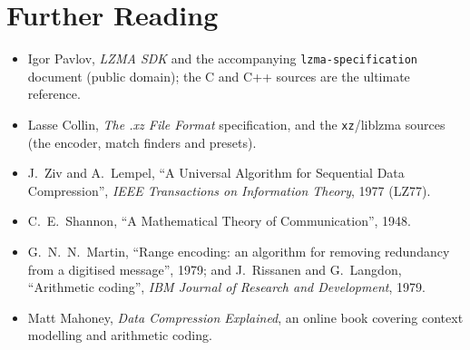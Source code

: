 \documentclass[11pt,a4paper,oneside]{book}
\begin{document}
\chapter{Further Reading}

\begin{itemize}
\item Igor Pavlov, \emph{LZMA SDK} and the accompanying \texttt{lzma-specification} document (public domain); the C and C++ sources are the ultimate reference.
\item Lasse Collin, \emph{The .xz File Format} specification, and the \texttt{xz}/liblzma sources (the encoder, match finders and presets).
\item J.\ Ziv and A.\ Lempel, ``A Universal Algorithm for Sequential Data Compression'', \emph{IEEE Transactions on Information Theory}, 1977 (LZ77).
\item C.\ E.\ Shannon, ``A Mathematical Theory of Communication'', 1948.
\item G.\ N.\ N.\ Martin, ``Range encoding: an algorithm for removing redundancy from a digitised message'', 1979; and J.\ Rissanen and G.\ Langdon, ``Arithmetic coding'', \emph{IBM Journal of Research and Development}, 1979.
\item Matt Mahoney, \emph{Data Compression Explained}, an online book covering context modelling and arithmetic coding.
\end{itemize}
\end{document}
